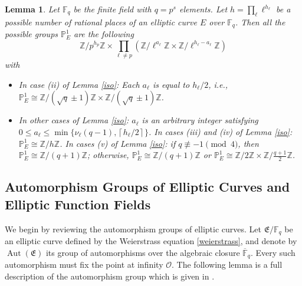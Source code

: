 \documentclass[journal,12pt,onecolumn]{IEEEtran}
\newtheorem{lemma}{Lemma}
\begin{document}
\begin{lemma}
    Let \( \mathbb{F}_q \) be the finite field with \( q = p^s \) elements. Let \( h = \prod_{\ell} \ell^{h_\ell} \) be a possible number of rational places of an elliptic curve \( E \) over \( \mathbb{F}_q \). Then all the possible groups \( \mathbb{P}^1_E \) are the following
    \[
        \mathbb{Z}/p^{h_p} \mathbb{Z} \times \prod_{\ell \neq p} (\mathbb{Z}/\ell^{a_\ell} \mathbb{Z} \times \mathbb{Z}/\ell^{h_\ell - a_\ell} \mathbb{Z})
    \]
    with
    \begin{itemize}
        \item[(I)] In case (ii) of Lemma \ref{iso}: Each \( a_\ell \) is equal to \( h_\ell / 2 \), i.e., \( \mathbb{P}^1_E \cong \mathbb{Z}/(\sqrt{q} \pm 1)\mathbb{Z} \times \mathbb{Z}/(\sqrt{q} \pm 1)\mathbb{Z} \).
        \item[(II)] In other cases of Lemma \ref{iso}: \( a_\ell \) is an arbitrary integer satisfying \( 0 \leq a_\ell \leq \min\{\nu_\ell(q-1), \left\lceil h_\ell/2\right\rceil\} \). In cases (iii) and (iv) of Lemma \ref{iso}: \( \mathbb{P}^1_E \cong \mathbb{Z}/h\mathbb{Z} \). In cases (v) of Lemma \ref{iso}: if \( q \not\equiv -1 \pmod{4} \), then \( \mathbb{P}^1_E \cong \mathbb{Z}/(q+1)\mathbb{Z} \); otherwise, \( \mathbb{P}^1_E \cong \mathbb{Z}/(q+1)\mathbb{Z} \) or \( \mathbb{P}^1_E \cong \mathbb{Z}/2\mathbb{Z} \times \mathbb{Z}/\frac{q+1}{2}\mathbb{Z} \).
    \end{itemize}
\end{lemma}




\subsection{Automorphism Groups of Elliptic Curves and Elliptic Function Fields}

We begin by reviewing the automorphism groups of elliptic curves. Let $\mathfrak{E}/\mathbb{F}_q$ be an elliptic curve defined by the Weierstrass equation \eqref{weierstrass}, and denote by $\operatorname{Aut}(\mathfrak{E})$ its group of automorphisms over the algebraic closure $\overline{\mathbb{F}}_q$. Every such automorphism must fix the point at infinity $\mathcal{O}$. The following lemma is a full description of the automorphism group which is given in \cite[Thm. 3.10.1]{silvermanArithmeticEllipticCurves2009}.
\end{document}
